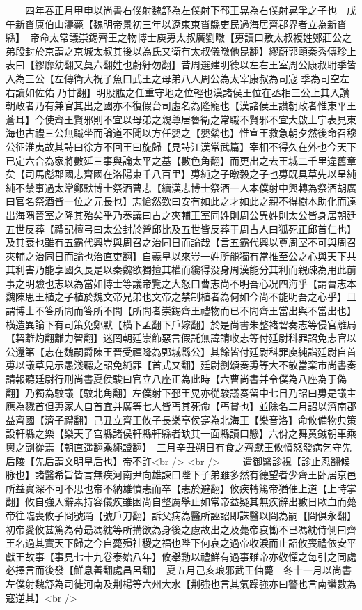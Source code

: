 　　四年春正月甲申以尚書右僕射魏舒為左僕射下邳王晃為右僕射晃孚之子也　戊午新沓康伯山濤薨【魏明帝景初三年以遼東東沓縣吏民過海居齊郡界者立為新沓縣】　帝命太常議崇錫齊王之物博士庾旉太叔廣劉暾【旉讀曰敷太叔複姓鄭莊公之弟段封於京謂之京城太叔其後以為氏又衛有太叔儀暾他昆翻】繆蔚郭頤秦秀傅珍上表曰【繆靡幼翻又莫六翻姓也蔚紆勿翻】昔周選建明德以左右王室周公康叔耼季皆入為三公【左傳衛大祝子魚曰武王之母弟八人周公為太宰康叔為司寇季為司空左右讀如佐佑乃甘翻】明股肱之任重守地之位輕也漢諸侯王位在丞相三公上其入讚朝政者乃有兼官其出之國亦不復假台司虛名為隆寵也【漢諸侯王讃朝政者惟東平王蒼耳】今使齊王賢邪則不宜以母弟之親尊居魯衛之常職不賢邪不宜大啟土宇表見東海也古禮三公無職坐而論道不聞以方任嬰之【嬰縈也】惟宣王救急朝夕然後命召穆公征淮夷故其詩曰徐方不回王曰旋歸【見詩江漢常武篇】宰相不得久在外也今天下已定六合為家將數延三事與論太平之基【數色角翻】而更出之去王城二千里違舊章矣【司馬彪郡國志齊國在洛陽東千八百里】旉純之子暾毅之子也旉既具草先以呈純純不禁事過太常鄭默博士祭酒曹志【續漢志博士祭酒一人本僕射中興轉為祭酒胡廣曰官名祭酒皆一位之元長也】志愴然歎曰安有如此之才如此之親不得樹本助化而遠出海隅晉室之隆其殆矣乎乃奏議曰古之夾輔王室同姓則周公異姓則太公皆身居朝廷五世反葬【禮記檀弓曰太公封於營邱比及五世皆反葬于周古人曰狐死正邱首仁也】及其衰也雖有五霸代興豈與周召之治同日而論哉【言五霸代興以尊周室不可與周召夾輔之治同日而論也治直吏翻】自羲皇以來豈一姓所能獨有當推至公之心與天下共其利害乃能享國久長是以秦魏欲獨擅其權而纔得没身周漢能分其利而親疎為用此前事之明驗也志以為當如博士等議帝覽之大怒曰曹志尚不明吾心况四海乎【謂曹志本魏陳思王植之子植於魏文帝兄弟也文帝之禁制植者為何如今尚不能明吾之心乎】且謂博士不答所問而答所不問【所問者崇錫齊王禮物而已不問齊王當出與不當出也】横造異論下有司策免鄭默【横下孟翻下戶嫁翻】於是尚書朱整褚䂮奏志等侵官離局【䂮離灼翻離力智翻】迷罔朝廷崇飾惡言假託無諱請收志等付廷尉科罪詔免志官以公還第【志在魏嗣爵陳王晉受禪降為鄄城縣公】其餘皆付廷尉科罪庾純詣廷尉自首旉以議草見示愚淺聽之詔免純罪【首式又翻】廷尉劉頌奏旉等大不敬當棄市尚書奏請報聽廷尉行刑尚書夏侯駿曰官立八座正為此時【六曹尚書并令僕為八座為于偽翻】乃獨為駮議【駮北角翻】左僕射下邳王晃亦從駿議奏留中七日乃詔曰旉是議主應為戮首但旉家人自首宜并廣等七人皆丐其死命【丐貸也】並除名二月詔以濟南郡益齊國【濟子禮翻】己丑立齊王攸子長樂亭侯寔為北海王【樂音洛】命攸備物典策設軒縣之樂【樂天子宫縣諸侯軒縣軒縣者缺其一面縣讀曰懸】六佾之舞黄鉞朝車乘輿之副從焉【朝直遥翻乘繩證翻】　三月辛丑朔日有食之齊獻王攸憤怒發病乞守先后陵【先后謂文明皇后也】帝不許<br />
<br />
　　遣御醫診視【診止忍翻候脉也】諸醫希旨皆言無疾河南尹向雄諫曰陛下子弟雖多然有德望者少齊王卧居京邑所益實深不可不思也帝不納雄憤恚而卒【恚於避翻】攸疾轉篤帝猶催上道【上時掌翻】攸自強入辭素持容儀疾雖困尚自整厲舉止如常帝益疑其無疾辭出數日歐血而薨帝往臨喪攸子冏號踊【號戶刀翻】訴父病為醫所誣詔即誅醫以冏為嗣【冏俱永翻】初帝愛攸甚篤為荀朂馮紞等所搆欲為身後之慮故出之及薨帝哀慟不已馮紞侍側曰齊王名過其實天下歸之今自薨殞社稷之福也陛下何哀之過帝收淚而止詔攸喪禮依安平獻王故事【事見七十九卷泰始八年】攸舉動以禮鮮有過事雖帝亦敬憚之每引之同處必擇言而後發【鮮息善翻處昌呂翻】　夏五月己亥琅邪武王伷薨　冬十一月以尚書左僕射魏舒為司徒河南及荆楊等六州大水【荆強也言其氣躁強亦曰警也言南蠻數為寇逆其】<br />
